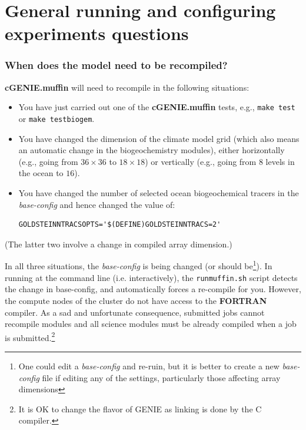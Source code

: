 \documentclass[11pt,fleqn]{book} %
\begin{document}

\newpage


\section{General running and configuring experiments questions}

%
\subsubsection{When does the model need to be recompiled?}

\textbf{cGENIE.muffin} will need to recompile in the following situations:

\begin{itemize}

\vspace{1mm}
\item You have just carried out one of the \textbf{cGENIE.muffin} tests, e.g., \texttt{make test} or \texttt{make testbiogem}.
\item You have changed the dimension of the climate model grid (which also means an automatic change in the biogeochemistry modules), either horizontally (e.g., going from \(36\times 36\) to \(18\times 18\)) or vertically (e.g., going from \(8\) levels in the ocean to \(16\)).
\item You have changed the number of selected ocean biogeochemical tracers in the \textit{base-config} and hence changed the value of:
\small\begin{verbatim}
GOLDSTEINNTRACSOPTS='$(DEFINE)GOLDSTEINNTRACS=2'
\end{verbatim}\normalsize

\end{itemize}
(The latter two involve a change in compiled array dimension.)

In all three situations, the \textit{base-config }is being changed (or should be\footnote{One could edit a \textit{base-config} and re-ruin, but it is better to create a new \textit{base-config }file if editing any of the settings, particularly those affecting array dimensions}). In running at the command line (i.e. interactively), the \texttt{\footnotesize runmuffin.sh} script detects the change in base-config, and automatically forces a re-compile for you. However, the compute nodes of the cluster do not have access to the \textbf{FORTRAN} compiler. As a sad and unfortunate consequence, submitted jobs cannot recompile modules and all science modules must be already compiled when a job is submitted.\footnote{It is OK to change the flavor of GENIE as linking is done by the C compiler.}
\end{document}
